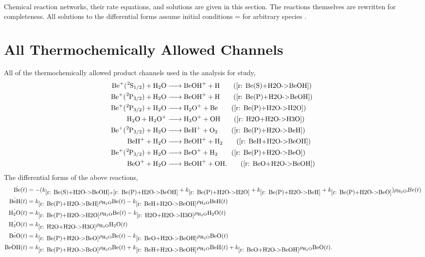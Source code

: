 Chemical reaction networks, their rate equations, and solutions are given in this section. The reactions themselves are rewritten for completeness. All solutions to the differential forms assume initial conditions  =  for arbitrary species .

\section{ All Thermochemically Allowed Channels}

All of the thermochemically allowed product channels used in the analysis for  study,
\begin{align}
	\ce{Be+(^2S1/2) + H2O & -> BeOH+ + H} \tag{\ref{r: Be(S)+H2O->BeOH}} \\
	\ce{Be+(^2P3/2) + H2O & -> BeOH+ + H} \tag{\ref{r: Be(P)+H2O->BeOH}} \\
	\ce{Be+(^2P3/2) + H2O & -> H2O+ + Be} \tag{\ref{r: Be(P)+H2O->H2O}} \\
	\ce{H2O + H2O+ & -> H3O+ + OH} \tag{\ref{r: H2O+H2O->H3O}} \\
	\ce{Be+(^2P3/2) + H2O & -> BeH+ + O2} \tag{\ref{r: Be(P)+H2O->BeH}} \\
	\ce{BeH+ + H2O & -> BeOH+ + H2} \tag{\ref{r: BeH+H2O->BeOH}} \\
	\ce{Be+(^2P3/2) + H2O & -> BeO+ + H2} \tag{\ref{r: Be(P)+H2O->BeO}} \\
	\ce{BeO+ + H2O & -> BeOH+ + OH}. \tag{\ref{r: BeO+H2O->BeOH}}
\end{align}
The differential forms of the above reactions,
\begin{align*}
	\dot{\ce{Be}}(t) & = -(k_{\ref{r: Be(S)+H2O->BeOH} + \ref{r: Be(P)+H2O->BeOH}} + k_{\ref{r: Be(P)+H2O->H2O}} + k_{\ref{r: Be(P)+H2O->BeH}} + k_{\ref{r: Be(P)+H2O->BeO}})\rho_{\ce{H2O}} Be(t) \\
	\dot{\ce{BeH}}(t) & = k_{\ref{r: Be(P)+H2O->BeH}} \rho_{\ce{H2O}} \ce{Be}(t) - k_{\ref{r: BeH+H2O->BeOH}} \rho_{\ce{H2O}} \ce{BeH}(t) \\
	\dot{\ce{H2O}}(t) & = k_{\ref{r: Be(P)+H2O->H2O}} \rho_{\ce{H2O}} \ce{Be}(t) - k_{\ref{r: H2O+H2O->H3O}} \rho_{\ce{H2O}} \ce{H2O}(t) \\
	\dot{\ce{H3O}}(t) & = k_{\ref{r: H2O+H2O->H3O}} \rho_{\ce{H2O}} \ce{H2O}(t) \\
	\dot{\ce{BeO}}(t) & = k_{\ref{r: Be(P)+H2O->BeO}} \rho_{\ce{H2O}} \ce{Be}(t) -k_{\ref{r: BeO+H2O->BeOH}} \rho_{\ce{H2O}} \ce{BeO}(t) \\
	\dot{\ce{BeOH}}(t) & = k_{\ref{r: Be(P)+H2O->BeO}} \rho_{\ce{H2O}} \ce{Be}(t) + k_{\ref{r: BeH+H2O->BeOH}} \rho_{\ce{H2O}} \ce{BeH}(t) + k_{\ref{r: BeO+H2O->BeOH}} \rho_{\ce{H2O}} \ce{BeO}(t).
\end{align*}
